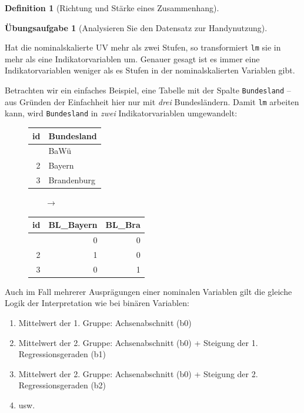 \documentclass[
  a4paper,
  DIV=11]{scrreprt}
\providecommand{\tightlist}{%
  \setlength{\itemsep}{0pt}\setlength{\parskip}{0pt}}\usepackage{longtable,booktabs,array}
\theoremstyle{definition}
\newtheorem{exercise}{Übungsaufgabe}[chapter]
\theoremstyle{definition}
\theoremstyle{definition}
\newtheorem{definition}{Definition}[chapter]
\theoremstyle{remark}
\begin{document}
\begin{definition}[Richtung und Stärke eines
Zusammenhang]
\begin{exercise}[Analysieren Sie den Datensatz zur
Handynutzung]
\begin{longtable}[]
\end{longtable}

Hat die nominalskalierte UV mehr als zwei Stufen, so transformiert
\texttt{lm} sie in mehr als eine Indikatorvariablen um. Genauer gesagt
ist es immer eine Indikatorvariablen weniger als es Stufen in der
nominalskalierten Variablen gibt.

Betrachten wir ein einfaches Beispiel, eine Tabelle mit der Spalte
\texttt{Bundesland} -- aus Gründen der Einfachheit hier nur mit
\emph{drei} Bundesländern. Damit \texttt{lm} arbeiten kann, wird
\texttt{Bundesland} in \emph{zwei} Indikatorvariablen umgewandelt:

\begin{figure}

\begin{minipage}{0.40\linewidth}

\begin{longtable}[]{@{}rl@{}}
\toprule\noalign{}
id & Bundesland \\
\midrule\noalign{}
\endhead
\bottomrule\noalign{}
\endlastfoot
1 & BaWü \\
2 & Bayern \\
3 & Brandenburg \\
\end{longtable}

\end{minipage}%
%
\begin{minipage}{0.20\linewidth}
\(\qquad \rightarrow\)\end{minipage}%
%
\begin{minipage}{0.40\linewidth}

\begin{longtable}[]{@{}rrr@{}}
\toprule\noalign{}
id & BL\_Bayern & BL\_Bra \\
\midrule\noalign{}
\endhead
\bottomrule\noalign{}
\endlastfoot
1 & 0 & 0 \\
2 & 1 & 0 \\
3 & 0 & 1 \\
\end{longtable}

\end{minipage}%

\end{figure}%

Auch im Fall mehrerer Ausprägungen einer nominalen Variablen gilt die
gleiche Logik der Interpretation wie bei binären Variablen:

\begin{enumerate}
\def\labelenumi{\arabic{enumi}.}
\tightlist
\item
  Mittelwert der 1. Gruppe: Achsenabschnitt (b0)
\item
  Mittelwert der 2. Gruppe: Achsenabschnitt (b0) + Steigung der 1.
  Regressionsgeraden (b1)
\item
  Mittelwert der 2. Gruppe: Achsenabschnitt (b0) + Steigung der 2.
  Regressionsgeraden (b2)
\item
  usw.
\end{enumerate}


\end{exercise}
\end{definition}
\end{document}
